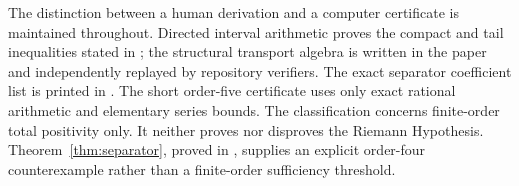 The distinction between a human derivation and a computer certificate is
maintained throughout. Directed interval arithmetic proves the compact and
tail inequalities stated in ; the structural transport
algebra is written in the paper and independently replayed by repository
verifiers. The exact separator coefficient list is printed in
. The short
order-five certificate uses only exact rational arithmetic and elementary
series bounds. The classification concerns finite-order total positivity
only. It neither proves nor disproves the Riemann Hypothesis.
Theorem~\ref{thm:separator}, proved in , supplies an
explicit order-four counterexample rather than a finite-order sufficiency
threshold.
